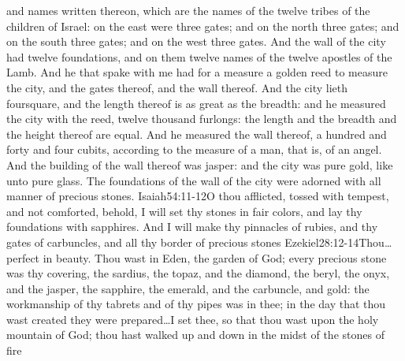  and names written thereon, which are the names of the twelve tribes of the children of Israel:%
on the east were three gates; and on the north three gates; and on the south three gates; and on the west three gates.
And the wall of the city had twelve foundations, and on them twelve names of the twelve apostles of the Lamb. 
And he that spake with me had for a measure a golden reed to measure the city, and the gates thereof, and the wall thereof.%
And the city lieth foursquare, and the length thereof is as great as the breadth:%
 and he measured the city with the reed, twelve thousand furlongs: the length and the breadth and the height thereof are equal.%
And he measured the wall thereof, a hundred and forty and four cubits, according to the measure of a man, that is, of an angel. 
And the building of the wall thereof was jasper: and the city was pure gold, like unto pure glass. 
The foundations of the wall of the city were adorned with all manner of precious stones.%
				{Isaiah}{54:11-12}{O thou afflicted, tossed with tempest, and not comforted, behold, I will set thy stones in fair colors, and lay thy foundations with sapphires. And I will make thy pinnacles of rubies, and thy gates of carbuncles, and all thy border of precious stones}%
				{Ezekiel}{28:12-14}{Thou\ldots perfect in beauty. Thou wast in Eden, the garden of God; every precious stone was thy covering, the sardius, the topaz, and the diamond, the beryl, the onyx, and the jasper, the sapphire, the emerald, and the carbuncle, and gold: the workmanship of thy tabrets and of thy pipes was in thee; in the day that thou wast created they were prepared\ldots I set thee, so that thou wast upon the holy mountain of God; thou hast walked up and down in the midst of the stones of fire} %
